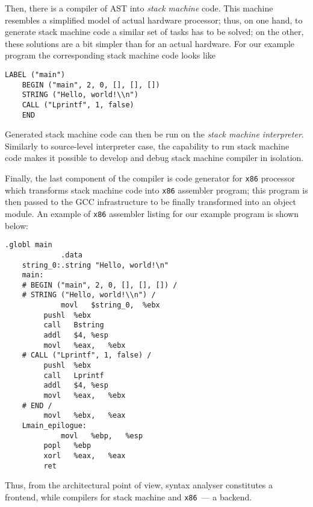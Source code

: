 Then, there is a compiler of AST into \emph{stack machine} code. This machine resembles a simplified model of
actual hardware processor; thus, on one hand, to generate stack machine code a similar set of tasks has to be
solved; on the other, these solutions are a bit simpler than for an actual hardware. For our example
program the corresponding stack machine code looks like

\begin{lstlisting}[language=plain,basicstyle=\small]
    LABEL ("main")
    BEGIN ("main", 2, 0, [], [], [])
    STRING ("Hello, world!\\n")
    CALL ("Lprintf", 1, false)
    END      
\end{lstlisting}

Generated stack machine code can then be run on the \emph{stack machine interpreter}. Similarly to source-level
interpreter case, the capability to run stack machine code makes it possible to develop and debug stack
machine compiler in isolation.

Finally, the last component of the compiler is code generator for \texttt{x86} processor which
transforms stack machine code into \texttt{x86} assembler program; this program is then passed to
the \textsc{GCC} infrastructure to be finally transformed into an object module. An example of
\texttt{x86} assembler listing for our example program is shown below:

\begin{lstlisting}[language=plain,basicstyle=\small]
             .globl	main
             .data
    string_0:.string "Hello, world!\n"
    main:
    # BEGIN ("main", 2, 0, [], [], []) / 
    # STRING ("Hello, world!\\n") / 
             movl	$string_0,	%ebx
	     pushl	%ebx
	     call	Bstring
	     addl	$4,	%esp
	     movl	%eax,	%ebx
    # CALL ("Lprintf", 1, false) / 
	     pushl	%ebx
	     call	Lprintf
	     addl	$4,	%esp
	     movl	%eax,	%ebx
    # END / 
	     movl	%ebx,	%eax
    Lmain_epilogue:
             movl	%ebp,	%esp
	     popl	%ebp
	     xorl	%eax,	%eax
	     ret
\end{lstlisting}

Thus, from the architectural point of view, syntax analyser constitutes a frontend, while compilers for
stack machine and \texttt{x86}~--- a backend.



